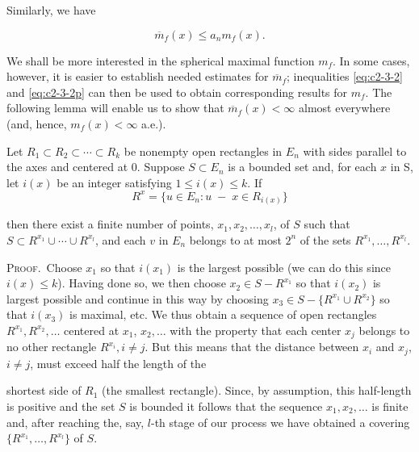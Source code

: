 Similarly, we have

\begin{equation}
\tag{3.2$'$}\label{eq:c2-3-2p}
\overline{m}_{f}(x)\leq a_{n}m_{f}(x).
\end{equation}

We shall be more interested in the spherical maximal function $m_f$. In some cases, however, it is easier to establish needed estimates for $\overline{m}_f$; inequalities \eqref{eq:c2-3-2} and \eqref{eq:c2-3-2p} can then be used to obtain corresponding results for $m_f$. The following lemma will enable us to show that $\overline{m}_f(x) < \infty$ almost everywhere (and, hence, $m_f(x) < \infty$ a.e.).

\begin{lemma}
\label{lem:c2-3-3}
Let $R_1 \subset R_2 \subset \cdots \subset R_k$ be nonempty open rectangles in $E_n$ with sides parallel to the axes and centered at 0. Suppose $S \subset E_n$ is a bounded set and, for each $x$ in S, let $i(x)$ be an integer satisfying $1 \leq i(x) \leq k$. If
\[
R^{x}=\{u\in E_{n}\colon u\;-\;x\in R_{i(x)}\}
\]

then there exist a finite number of points, $x_1, x_2, \ldots, x_l$, of $S$ such that $S \subset R^{x_1} \cup \cdots \cup R^{x_l}$, and each $v$ in $E_n$ belongs to at most $2^n$ of the sets $R^{x_1}, \ldots, R^{x_l}$.
\end{lemma}

\textsc{Proof.}\ Choose $x_1$ so that $i(x_1)$ is the largest possible (we can do this since $i(x) \leq k$). Having done so, we then choose $x_2 \in S - R^{x_1}$ so that $i(x_2)$ is largest possible and continue in this way by choosing $x_3 \in S - \{R^{x_1} \cup R^{x_2}\}$ so that $i(x_3)$ is maximal, etc. We thus obtain a sequence of open rectangles $R^{x_1}, R^{x_2}, \ldots$ centered at $x_1$, $x_2, \ldots$ with the property that each center $x_j$ belongs to no other rectangle $R^{x_i}, i \neq j$. But this means that the distance between $x_i$ and $x_j$, $i \neq j$, must exceed half the length of the

shortest side of $R_1$ (the smallest rectangle). Since, by assumption, this half-length is positive and the set $S$ is bounded it follows that the sequence $x_1, x_2, \ldots$ is finite and, after reaching the, say, $l$-th stage of our process we have obtained a covering $\{R^{x_1}, \ldots, R^{x_l}\}$ of $S$.

